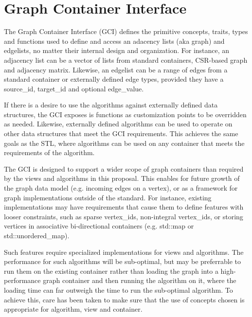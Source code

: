 
\clearpage
\section{Graph Container Interface}

The Graph Container Interface (GCI) defines the primitive concepts, traits, types and functions used to define and access an adacency lists (aka graph)
and edgelists, no matter their internal design and organization. For instance, an adjacency list can be a vector of lists from standard containers, 
CSR-based graph and adjacency matrix. Likewise, an edgelist can be a range of edges from a standard container or externally defined edge types, 
provided they have a source\_id, target\_id and optional edge\_value. 

If there is a desire to use the algorithms against externally defined data structures, the GCI exposes is functions as customization points
to be overridden as needed. Likewise, externally defined algorithms can be used to operate on other data structures that meet the GCI requirements.
This achieves the same goals as the STL, where algorithms can be used on any container that meets the requirements of the algorithm.

The GCI is designed to support a wider scope of graph containers than required by the views and algorithms in this 
proposal. This enables for future growth of the graph data model (e.g. incoming edges on a vertex), or as a framework for graph implementations 
outside of the standard. For instance, existing implementations may have requirements that cause them to define features with looser constraints, 
such as sparse vertex\_ids, non-integral vertex\_ids, or storing vertices in associative bi-directional containers (e.g. std::map or std::unordered\_map). 

Such features require specialized implementations for views and algorithms. The performance for such algorithms will be sub-optimal, but may be
preferrable to run them on the existing container rather than loading the graph into a high-performance graph container and then running the 
algorithm on it, where the loading time can far outweigh the time to run the sub-optimal algorithm. To achieve this, care has been taken to 
make sure that the use of concepts chosen is appropriate for algorithm, view and container.

